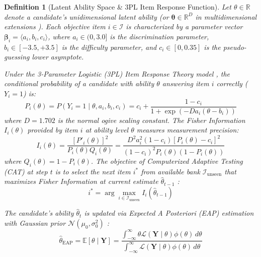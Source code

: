 \documentclass[conference]{IEEEtran}
\newtheorem{definition}{Definition}
\begin{document}
\begin{definition}[Latent Ability Space \& 3PL Item Response Function]
Let $\theta \in \mathbb{R}$ denote a candidate's unidimensional latent ability (or $\boldsymbol{\theta} \in \mathbb{R}^D$ in multidimensional extensions \cite{Li2025}). Each objective item $i \in \mathcal{I}$ is characterized by a parameter vector $\boldsymbol{\beta}_i = \langle a_i, b_i, c_i \rangle$, where $a_i \in (0, 3.0]$ is the discrimination parameter, $b_i \in [-3.5, +3.5]$ is the difficulty parameter, and $c_i \in [0, 0.35]$ is the pseudo-guessing lower asymptote.

Under the 3-Parameter Logistic (3PL) Item Response Theory model \cite{Lord1980,Birnbaum1968}, the conditional probability of a candidate with ability $\theta$ answering item $i$ correctly ($Y_i = 1$) is:
\begin{equation}
    P_i(\theta) = P(Y_i = 1 \mid \theta, a_i, b_i, c_i) = c_i + \frac{1 - c_i}{1 + \exp\left(-D a_i (\theta - b_i)\right)}
    \label{eq:3pl}
\end{equation}
where $D = 1.702$ is the normal ogive scaling constant. The Fisher Information $I_i(\theta)$ provided by item $i$ at ability level $\theta$ measures measurement precision:
\begin{equation}
    I_i(\theta) = \frac{\left[P'_i(\theta)\right]^2}{P_i(\theta) Q_i(\theta)} = \frac{D^2 a_i^2 (1 - c_i) \left[P_i(\theta) - c_i\right]^2}{\left(1 - c_i\right)^2 P_i(\theta) \left(1 - P_i(\theta)\right)}
    \label{eq:fisher_info}
\end{equation}
where $Q_i(\theta) = 1 - P_i(\theta)$. The objective of Computerized Adaptive Testing (CAT) at step $t$ is to select the next item $i^*$ from available bank $\mathcal{I}_{\text{unseen}}$ that maximizes Fisher Information at current estimate $\hat{\theta}_{t-1}$ \cite{Zhuang2026,Sharpnack2024,Sharpnack2025}:
\begin{equation}
    i^* = \arg\max_{i \in \mathcal{I}_{\text{unseen}}} I_i(\hat{\theta}_{t-1})
    \label{eq:mfi_selection}
\end{equation}

The candidate's ability $\hat{\theta}_t$ is updated via Expected A Posteriori (EAP) estimation with Gaussian prior $\mathcal{N}(\mu_0, \sigma_0^2)$ \cite{BockMislevy1982}:
\begin{equation}
    \hat{\theta}_{\text{EAP}} = \mathbb{E}[\theta \mid \mathbf{Y}] = \frac{\int_{-\infty}^{\infty} \theta \mathcal{L}(\mathbf{Y} \mid \theta) \phi(\theta) \, d\theta}{\int_{-\infty}^{\infty} \mathcal{L}(\mathbf{Y} \mid \theta) \phi(\theta) \, d\theta}
    \label{eq:eap_integral}
\end{equation}
\end{definition}
\end{document}
